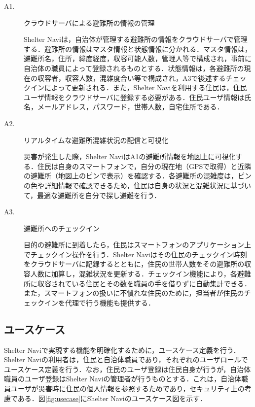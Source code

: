 \documentclass[technicalreport,dvipdfmx]{ieicej}
\begin{document}
\begin{description}
     \item[A1.] クラウドサーバによる避難所の情報の管理
     
     Shelter Naviは，自治体が管理する避難所の情報をクラウドサーバで管理する．避難所の情報はマスタ情報と状態情報に分かれる．マスタ情報は，避難所名，住所，緯度経度，収容可能人数，管理人等で構成され，事前に自治体の職員によって登録されるものとする．状態情報は，各避難所の現在の収容者，収容人数，混雑度合い等で構成され，A3で後述するチェックインによって更新される．また，Shelter Naviを利用する住民は，住民ユーザ情報をクラウドサーバに登録する必要がある．住民ユーザ情報は氏名，メールアドレス，パスワード，世帯人数，自宅住所である．

     \item[A2.] リアルタイムな避難所混雑状況の配信と可視化
     
     災害が発生した際，Shelter NaviはA1の避難所情報を地図上に可視化する．住民は自身のスマートフォンで，自分の現在地（GPSで取得）と近隣の避難所（地図上のピンで表示）を確認する．各避難所の混雑度は，ピンの色や詳細情報で確認できるため，住民は自身の状況と混雑状況に基づいて，最適な避難所を自分で探し避難を行う．

     \item[A3.] 避難所へのチェックイン
     
     目的の避難所に到着したら，住民はスマートフォンのアプリケーション上でチェックイン操作を行う．Shelter Naviはその住民のチェックイン時刻をクラウドサーバに記録するとともに，住民の世帯人数をその避難所の収容人数に加算し，混雑状況を更新する．チェックイン機能により，各避難所に収容されている住民とその数を職員の手を借りずに自動集計できる．また，スマートフォンの扱いに不慣れな住民のために，担当者が住民のチェックインを代理で行う機能も提供する．
\end{description}

\subsection{ユースケース}
Shelter Naviで実現する機能を明確化するために，ユースケース定義を行う．Shelter Naviの利用者は，住民と自治体職員であり，それぞれのユーザロールでユースケース定義を行う．なお，住民のユーザ登録は住民自身が行うが，自治体職員のユーザ登録はShelter Naviの管理者が行うものとする．これは，自治体職員ユーザが災害時に住民の個人情報を参照するためであり，セキュリティ上の考慮である．図\ref{fig:usecase}にShelter Naviのユースケース図を示す．
\end{document}
